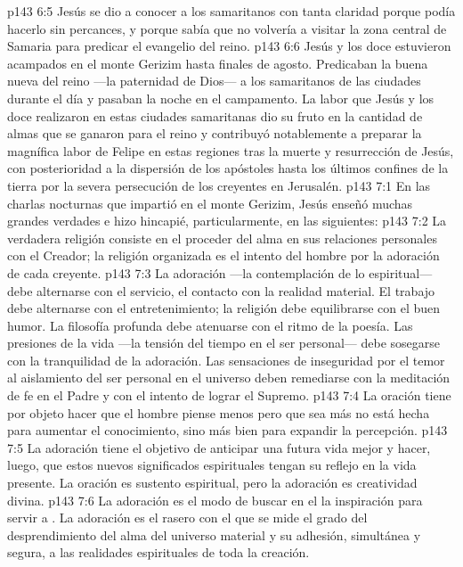 \vs p143 6:5 Jesús se dio a conocer a los samaritanos con tanta claridad porque podía hacerlo sin percances, y porque sabía que no volvería a visitar la zona central de Samaria para predicar el evangelio del reino.
\vs p143 6:6 Jesús y los doce estuvieron acampados en el monte Gerizim hasta finales de agosto. Predicaban la buena nueva del reino ---la paternidad de Dios--- a los samaritanos de las ciudades durante el día y pasaban la noche en el campamento. La labor que Jesús y los doce realizaron en estas ciudades samaritanas dio su fruto en la cantidad de almas que se ganaron para el reino y contribuyó notablemente a preparar la magnífica labor de Felipe en estas regiones tras la muerte y resurrección de Jesús, con posterioridad a la dispersión de los apóstoles hasta los últimos confines de la tierra por la severa persecución de los creyentes en Jerusalén.
\vs p143 7:1 En las charlas nocturnas que impartió en el monte Gerizim, Jesús enseñó muchas grandes verdades e hizo hincapié, particularmente, en las siguientes:
\vs p143 7:2 \pc La verdadera religión consiste en el proceder del alma en sus relaciones personales con el Creador; la religión organizada es el intento del hombre por  la adoración de cada creyente.
\vs p143 7:3 \pc La adoración ---la contemplación de lo espiritual--- debe alternarse con el servicio, el contacto con la realidad material. El trabajo debe alternarse con el entretenimiento; la religión debe equilibrarse con el buen humor. La filosofía profunda debe atenuarse con el ritmo de la poesía. Las presiones de la vida ---la tensión del tiempo en el ser personal--- debe sosegarse con la tranquilidad de la adoración. Las sensaciones de inseguridad por el temor al aislamiento del ser personal en el universo deben remediarse con la meditación de fe en el Padre y con el intento de lograr el Supremo.
\vs p143 7:4 \pc La oración tiene por objeto hacer que el hombre piense menos pero que sea más  no está hecha para aumentar el conocimiento, sino más bien para expandir la percepción.
\vs p143 7:5 \pc La adoración tiene el objetivo de anticipar una futura vida mejor y hacer, luego, que estos nuevos significados espirituales tengan su reflejo en la vida presente. La oración es sustento espiritual, pero la adoración es creatividad divina.
\vs p143 7:6 \pc La adoración es el modo de buscar en el  la inspiración para servir a . La adoración es el rasero con el que se mide el grado del desprendimiento del alma del universo material y su adhesión, simultánea y segura, a las realidades espirituales de toda la creación.
